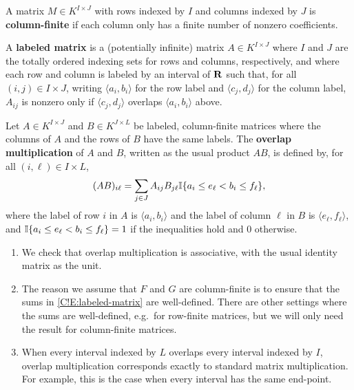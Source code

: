\begin{definition}
\label{C!D:column-finite-matrices}
  A matrix $M \in K^{I \times J}$ with rows indexed by $I$ and columns indexed by $J$ is \textbf{column-finite} if each column only has a finite number of nonzero coefficients.
\end{definition}

\begin{definition}
\label{C!D:labeled-matrix}
  A \textbf{labeled matrix} is a (potentially infinite) matrix $A \in K^{I \times J}$ where $I$ and $J$ are the totally ordered indexing sets for rows and columns, respectively, and where each row and column is labeled by an interval of $\mathbf{R}$ such that, for all $(i, j) \in I \times J$, writing $\langle a_i, b_i \rangle$ for the row label and $\langle c_j, d_j \rangle$ for the column label, $A_{ij}$ is nonzero only if $\langle c_j, d_j \rangle$ overlaps $\langle a_i, b_i \rangle$ above.

  Let $A \in K^{I \times J}$ and $B \in K^{J \times L}$ be labeled, column-finite matrices where the co\-lumns of $A$ and the rows of $B$ have the same labels. The \textbf{overlap multiplication} of $A$ and $B$, written as the usual product $AB$, is defined by, for all $(i, \ell) \in I \times L$,
  \begin{equation}
  \label{C!E:labeled-matrix}
    (AB)_{i \ell} = \sum_{j \in J} A_{ij} B_{j\ell} \mathbb{I}\{a_i \leq e_\ell < b_i \leq f_\ell\},
  \end{equation}
  where the label of row $i$ in $A$ is $\langle a_i, b_i \rangle$ and the label of column $\ell$ in $B$ is $\langle e_\ell, f_\ell \rangle$, and $\mathbb{I}\{a_i \leq e_\ell < b_i \leq f_\ell\} = 1$ if the inequalities hold and $0$ otherwise.
\end{definition}

\begin{remark}
  \begin{enumerate}
    \item We check that overlap multiplication is associative, with the usual identity matrix as the unit.
    \item The reason we assume that $F$ and $G$ are column-finite is to ensure that the sums in \eqref{C!E:labeled-matrix} are well-defined. There are other settings where the sums are well-defined, e.g.\ for row-finite matrices, but we will only need the result for column-finite matrices.
    \item When every interval indexed by $L$ overlaps every interval indexed by $I$, overlap multiplication corresponds exactly to standard matrix multiplication. For example, this is the case when every interval has the same end-point. \qedhere
  \end{enumerate}
\end{remark}

